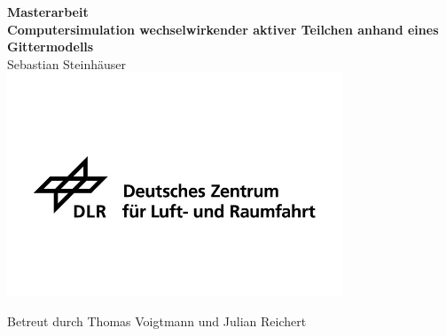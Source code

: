 \documentclass[a4paper, 12pt]{report}
\author{Sebastian Steinhäuser}
\begin{document}
\renewcommand{\thepage}{\roman{page}}%
\begin{center}
	\Large{\textbf{Masterarbeit}}
	\\
	\vspace{1cm}
	\Huge{\textbf{Computersimulation wechselwirkender aktiver Teilchen anhand eines Gittermodells}}
	\\
	\vspace{1cm}
	\Large{Sebastian Steinhäuser}
	\includegraphics[width=0.75\textwidth]{DLR.jpg}
\end{center}
\begin{center}
	Betreut durch Thomas Voigtmann und Julian Reichert
\end{center}
\newpage
\tableofcontents
\clearpage
\end{document}

